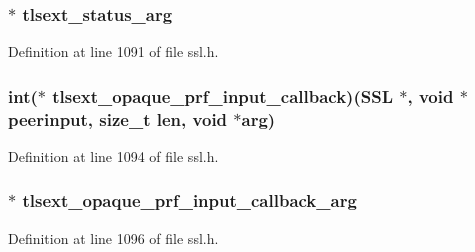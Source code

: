 \subsubsection[{\texorpdfstring{tlsext\+\_\+status\+\_\+arg}{tlsext_status_arg}}]{ $\ast$ tlsext\+\_\+status\+\_\+arg}\hypertarget{structssl__ctx__st_a30290aa35e636b55826d49768bfe15ed}{}\label{structssl__ctx__st_a30290aa35e636b55826d49768bfe15ed}


Definition at line 1091 of file ssl.\+h.

\subsubsection[{\texorpdfstring{tlsext\+\_\+opaque\+\_\+prf\+\_\+input\+\_\+callback}{tlsext_opaque_prf_input_callback}}]{\setlength{\rightskip}{0pt plus 5cm}int($\ast$ tlsext\+\_\+opaque\+\_\+prf\+\_\+input\+\_\+callback)({\bf S\+SL} $\ast$, {\bf void} $\ast$peerinput, size\+\_\+t {\bf len}, {\bf void} $\ast$arg)}\hypertarget{structssl__ctx__st_aeeecc2d6865411f7c0300111d18a230e}{}\label{structssl__ctx__st_aeeecc2d6865411f7c0300111d18a230e}


Definition at line 1094 of file ssl.\+h.

\subsubsection[{\texorpdfstring{tlsext\+\_\+opaque\+\_\+prf\+\_\+input\+\_\+callback\+\_\+arg}{tlsext_opaque_prf_input_callback_arg}}]{ $\ast$ tlsext\+\_\+opaque\+\_\+prf\+\_\+input\+\_\+callback\+\_\+arg}\hypertarget{structssl__ctx__st_a655714f0ea7064ffb46f3cb97e986f98}{}\label{structssl__ctx__st_a655714f0ea7064ffb46f3cb97e986f98}


Definition at line 1096 of file ssl.\+h.

